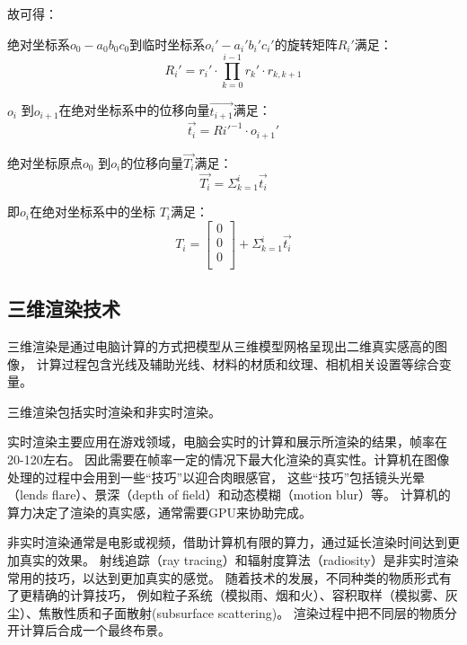 \begin{itemize}
故可得：

绝对坐标系$o_0-a_0b_0c_0$到临时坐标系$o_i'-a_i'b_i'c_i'$的旋转矩阵$R_i'$满足：
    \begin{equation}
    R_i' = r_i' \cdot \prod_{k = 0}^{i-1} r_k' \cdot r_{k, k+1}
    \end{equation}
    
$o_i$ 到$o_{i+1}$在绝对坐标系中的位移向量$\vec{t_{i+1}}$满足：
    \begin{equation}
    \vec{t_i} = Ri'^{-1}\cdot o_{i+1}'
    \end{equation}

绝对坐标原点$o_0$ 到$o_i$的位移向量$\vec{T_i}$满足：
    \begin{equation}
    \vec{T_i} = \Sigma_{k=1} ^ {i} \vec{t_i}
    \end{equation}

即$o_i$在绝对坐标系中的坐标 $T_i$满足\cite{用于光纤光栅曲线重建算法的坐标点拟合}：
\begin{equation}
T_i = \left[
    \begin{matrix}
    0\\
    0\\
    0\\
  	\end{matrix}
  \right]
  + \Sigma_{k=1} ^ {i} \vec{t_i}
\end{equation}

\end{itemize}

\subsection{三维渲染技术}
\label{sec:render}

三维渲染是通过电脑计算的方式把模型从三维模型网格呈现出二维真实感高的图像\cite{3DModels_SurveyPaper}，
计算过程包含光线及辅助光线、材料的材质和纹理、相机相关设置等综合变量\cite{scientce-of-3d-rendering}。

三维渲染包括实时渲染和非实时渲染。

实时渲染主要应用在游戏领域，电脑会实时的计算和展示所渲染的结果，帧率在20-120左右。
因此需要在帧率一定的情况下最大化渲染的真实性。计算机在图像处理的过程中会用到一些“技巧”以迎合肉眼感官，
这些“技巧”包括镜头光晕（lends flare）、景深（depth of field）和动态模糊（motion blur）等。
计算机的算力决定了渲染的真实感，通常需要GPU来协助完成。

非实时渲染通常是电影或视频，借助计算机有限的算力，通过延长渲染时间达到更加真实的效果。
射线追踪（ray tracing）和辐射度算法（radiosity）是非实时渲染常用的技巧，以达到更加真实的感觉。
随着技术的发展，不同种类的物质形式有了更精确的计算技巧，
例如粒子系统（模拟雨、烟和火）、容积取样（模拟雾、灰尘）、焦散性质和子面散射(subsurface scattering)。
渲染过程中把不同层的物质分开计算后合成一个最终布景。

